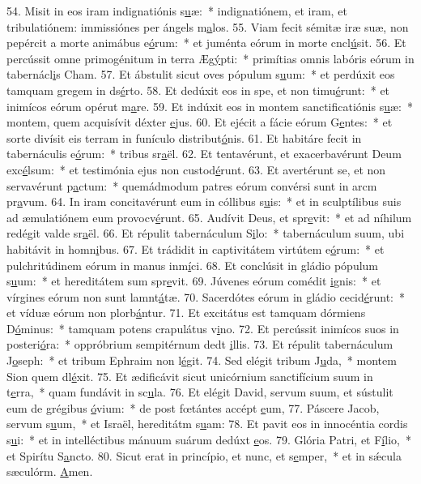 54. Misit in eos iram indignatiónis s\uline{u}æ:~* indignatiónem, et iram, et tribulatiónem: immissiónes per ángels m\uline{a}los.
55. Viam fecit sémitæ iræ suæ, non pepércit a morte animábus e\uline{ó}rum:~* et juménta eórum in morte cncl\uline{ú}sit.
56. Et percússit omne primogénitum in terra Æg\uline{ý}pti:~* primítias omnis labóris eórum in tabernácl\uline{i}s Cham.
57. Et ábstulit sicut oves pópulum s\uline{u}um:~* et perdúxit eos tamquam gregem in ds\uline{é}rto.
58. Et dedúxit eos in spe, et non timu\uline{é}runt:~* et inimícos eórum opérut m\uline{a}re.
59. Et indúxit eos in montem sanctificatiónis s\uline{u}æ:~* montem, quem acquisívit déxter \uline{e}jus.
60. Et ejécit a fácie eórum G\uline{e}ntes:~* et sorte divísit eis terram in funículo distribut\uline{ó}nis.
61. Et habitáre fecit in tabernáculis e\uline{ó}rum:~* tribus sr\uline{a}ël.
62. Et tentavérunt, et exacerbavérunt Deum exc\uline{é}lsum:~* et testimónia ejus non custod\uline{é}runt.
63. Et avertérunt se, et non servavérunt p\uline{a}ctum:~* quemádmodum patres eórum convérsi sunt in arcm pr\uline{a}vum.
64. In iram concitavérunt eum in cóllibus s\uline{u}is:~* et in sculptílibus suis ad æmulatiónem eum provocv\uline{é}runt.
65. Audívit Deus, et spr\uline{e}vit:~* et ad níhilum redégit valde sr\uline{a}ël.
66. Et répulit tabernáculum S\uline{i}lo:~* tabernáculum suum, ubi habitávit in homn\uline{i}bus.
67. Et trádidit in captivitátem virtútem e\uline{ó}rum:~* et pulchritúdinem eórum in manus inm\uline{í}ci.
68. Et conclúsit in gládio pópulum s\uline{u}um:~* et hereditátem sum spr\uline{e}vit.
69. Júvenes eórum comédit \uline{i}gnis:~* et vírgines eórum non sunt lamnt\uline{á}tæ.
70. Sacerdótes eórum in gládio cecid\uline{é}runt:~* et víduæ eórum non plorb\uline{á}ntur.
71. Et excitátus est tamquam dórmiens D\uline{ó}minus:~* tamquam potens crapulátus  v\uline{i}no.
72. Et percússit inimícos suos in posteri\uline{ó}ra:~* oppróbrium sempitérnum dedt \uline{i}llis.
73. Et répulit tabernáculum J\uline{o}seph:~* et tribum Ephraim non l\uline{é}git.
74. Sed elégit tribum J\uline{u}da,~* montem Sion quem dl\uline{é}xit.
75. Et ædificávit sicut unicórnium sanctifícium suum in t\uline{e}rra,~* quam fundávit in sc\uline{u}la.
76. Et elégit David, servum suum, et sústulit eum de grégibus \uline{ó}vium:~* de post fœtántes accépt \uline{e}um,
77. Páscere Jacob, servum s\uline{u}um,~* et Israël, hereditátm s\uline{u}am:
78. Et pavit eos in innocéntia cordis s\uline{u}i:~* et in intelléctibus mánuum suárum dedúxt \uline{e}os.
79. Glória Patri, et F\uline{í}lio,~* et Spirítu S\uline{a}ncto.
80. Sicut erat in princípio, et nunc, et s\uline{e}mper,~* et in sǽcula sæculórm. \uline{A}men.
